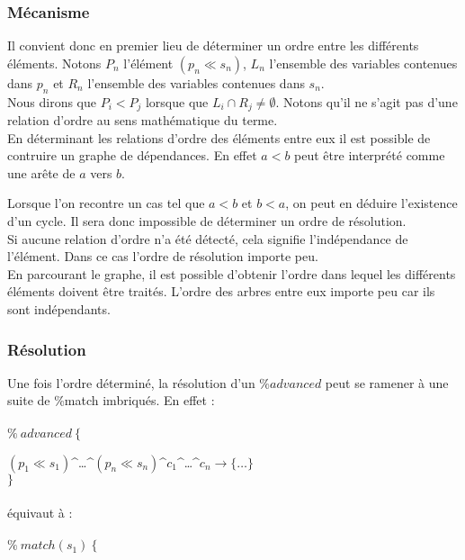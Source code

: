 \documentclass{article}
\newcommand{\filter}{\ll}
\begin{document}
\subsubsection{M\'ecanisme}
Il convient donc en premier lieu de d\'eterminer un ordre entre les diff\'erents \'el\'ements. Notons $P_n$ l'\'el\'ement $(p_n \filter s_n)$, $L_n$ l'ensemble des variables contenues dans $p_n$ et $R_n$ l'ensemble des variables contenues dans $s_n$.\\

Nous dirons que $P_i < P_j$ lorsque que $L_i \cap R_j \ne \emptyset$. Notons qu'il ne s'agit pas d'une relation d'ordre au sens math\'ematique du terme.\\

En d\'eterminant les relations d'ordre des \'el\'ements entre eux il est possible de contruire un graphe de d\'ependances.  En effet $a < b$ peut \^etre interpr\'et\'e comme une ar\^ete de $a$ vers $b$.

Lorsque l'on recontre un cas tel que $a < b$ et $b < a$, on peut en d\'eduire l'existence d'un cycle. Il sera donc impossible de d\'eterminer un ordre de r\'esolution.\\

Si aucune relation d'ordre n'a \'et\'e d\'etect\'e, cela signifie l'ind\'ependance de l'\'el\'ement. Dans ce cas l'ordre de r\'esolution importe peu.\\

En parcourant le graphe, il est possible d'obtenir l'ordre dans lequel les diff\'erents \'el\'ements doivent \^etre trait\'es. L'ordre des arbres entre eux importe peu car ils sont ind\'ependants.

\subsubsection{R\'esolution}
Une fois l'ordre d\'etermin\'e, la r\'esolution d'un $\%advanced$ peut se ramener à une suite de \%match imbriqu\'es. En effet :
\\\\
$\%\:advanced\:\{$

$(p_1\filter s_1)$\textasciicircum\dots\textasciicircum$(p_n\filter s_n)$\textasciicircum$c_1$\textasciicircum\dots\textasciicircum$c_n\rightarrow\{\dots\}$
\\$\}$
\\\\
\'equivaut \`a :
\\\\
$\%\:match(s_1)\:\{$
\end{document}
